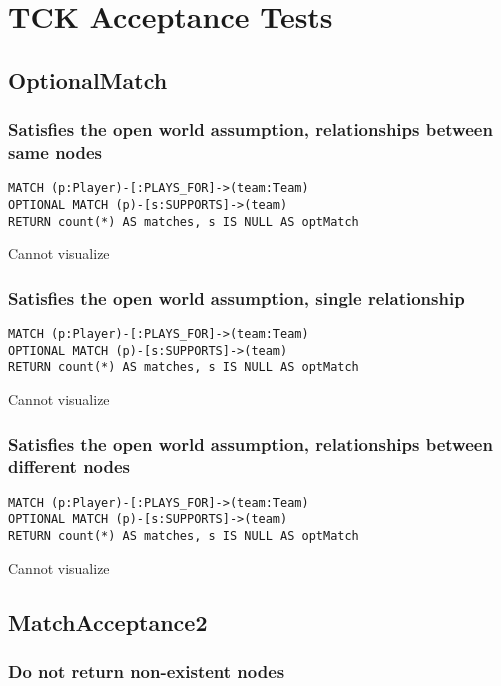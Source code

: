 \chapter{TCK Acceptance Tests}

\section{OptionalMatch}

\subsection{Satisfies the open world assumption, relationships between same nodes}

\begin{lstlisting}
MATCH (p:Player)-[:PLAYS_FOR]->(team:Team)
OPTIONAL MATCH (p)-[s:SUPPORTS]->(team)
RETURN count(*) AS matches, s IS NULL AS optMatch
\end{lstlisting}

Cannot visualize
\subsection{Satisfies the open world assumption, single relationship}

\begin{lstlisting}
MATCH (p:Player)-[:PLAYS_FOR]->(team:Team)
OPTIONAL MATCH (p)-[s:SUPPORTS]->(team)
RETURN count(*) AS matches, s IS NULL AS optMatch
\end{lstlisting}

Cannot visualize
\subsection{Satisfies the open world assumption, relationships between different nodes}

\begin{lstlisting}
MATCH (p:Player)-[:PLAYS_FOR]->(team:Team)
OPTIONAL MATCH (p)-[s:SUPPORTS]->(team)
RETURN count(*) AS matches, s IS NULL AS optMatch
\end{lstlisting}

Cannot visualize
\section{MatchAcceptance2}

\subsection{Do not return non-existent nodes}

